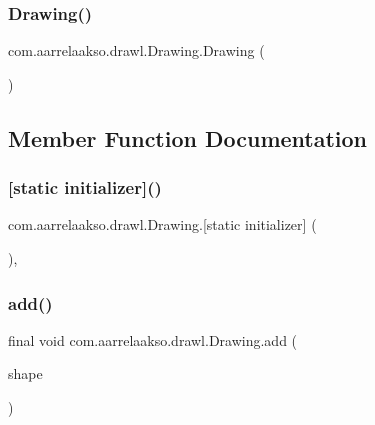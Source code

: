 \subsubsection{\texorpdfstring{Drawing()}{Drawing()}}
{\footnotesize\ttfamily com.\+aarrelaakso.\+drawl.\+Drawing.\+Drawing (\begin{DoxyParamCaption}{ }\end{DoxyParamCaption})}



\subsection{Member Function Documentation}
\mbox{\label{classcom_1_1aarrelaakso_1_1drawl_1_1_drawing_a40ce84a6d8110f7fb23a8faad42fb05f}} 
\subsubsection{\texorpdfstring{[static initializer]()}{[static initializer]()}}
{\footnotesize\ttfamily com.\+aarrelaakso.\+drawl.\+Drawing.\mbox{[}static initializer\mbox{]} (\begin{DoxyParamCaption}{ }\end{DoxyParamCaption})\hspace{0.3cm}{\ttfamily [static]}, {\ttfamily [package]}}

\mbox{\label{classcom_1_1aarrelaakso_1_1drawl_1_1_drawing_abb794d2aac631a7e20f3cd6948d117fe}} 
\subsubsection{\texorpdfstring{add()}{add()}}
{\footnotesize\ttfamily final void com.\+aarrelaakso.\+drawl.\+Drawing.\+add (\begin{DoxyParamCaption}\item[{@Not\+Null final \hyperlink{classcom_1_1aarrelaakso_1_1drawl_1_1_shape}{Shape}}]{shape }\end{DoxyParamCaption})}



